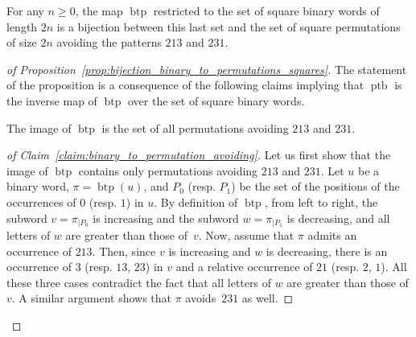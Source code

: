 \documentclass[a4paper]{llncs}
\DeclareMathOperator{\BINTOPERM}{\mathrm{btp}}
\DeclareMathOperator{\PERMTOBIN}{\mathrm{ptb}}
\begin{document}
\begin{proposition} \label{prop:bijection_binary_to_permutations_squares}
    For any $n \geq 0$, the map $\BINTOPERM$ restricted to the set of
    square binary words of length $2n$ is a bijection between this last
    set and the set of square permutations of size $2n$ avoiding the
    patterns $213$ and $231$.
\end{proposition}
\begin{proof}
    [of Proposition~\ref{prop:bijection_binary_to_permutations_squares}]
    The statement of the proposition is a consequence of the
    following claims implying that $\PERMTOBIN$ is the inverse
    map of $\BINTOPERM$ over the set of square binary words.
    \begin{claim} \label{claim:binary_to_permutation_avoiding}
        The image of $\BINTOPERM$ is the set of all permutations
        avoiding $213$ and $231$.
    \end{claim}
    \begin{proof}[of Claim~\ref{claim:binary_to_permutation_avoiding}]
        Let us first show that the image of $\BINTOPERM$ contains only
        permutations avoiding $213$ and $231$. Let $u$ be a binary word,
        $\pi = \BINTOPERM(u)$, and $P_0$ (resp. $P_1$) be the set of the
        positions of the occurrences of $0$ (resp. $1$) in $u$. By
        definition of $\BINTOPERM$, from left to right, the subword
        $v = \pi_{|P_0}$ is increasing and the subword $w = \pi_{|P_1}$
        is decreasing, and all letters of $w$ are greater than those
        of~$v$. Now, assume that $\pi$ admits an occurrence of $213$.
        Then, since $v$ is increasing and $w$ is decreasing, there is an
        occurrence of $3$ (resp. $13$, $23$) in $v$ and a relative
        occurrence of $21$ (resp. $2$, $1$). All these three cases
        contradict the fact that all letters of $w$ are greater than
        those of $v$. A similar argument shows that $\pi$ avoids~$231$
        as well.
        \smallskip


\end{proof}
\end{proof}
\end{document}
